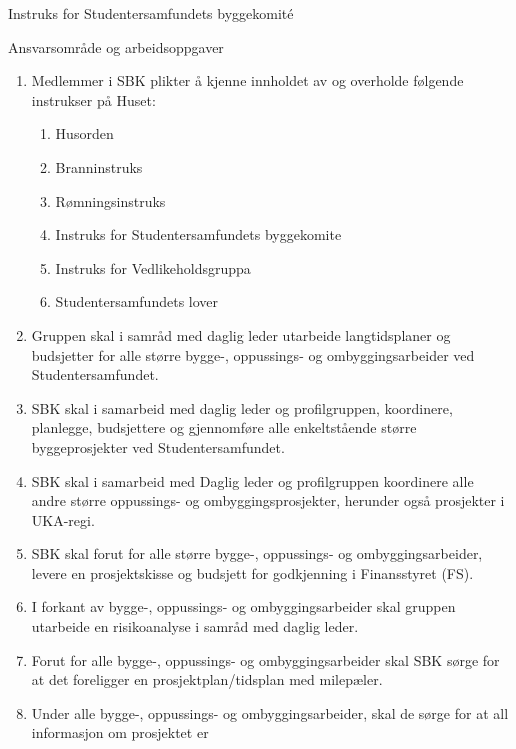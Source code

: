\begin{instruks}{Instruks for Studentersamfundets byggekomité}{}{}
    \begin{instruksledd}{ Ansvarsområde og arbeidsoppgaver}
        \begin{enumerate}
            \item Medlemmer i SBK plikter å kjenne innholdet av og overholde følgende instrukser på
                Huset:
                \begin{enumerate}
                    \item Husorden
                    \item Branninstruks
                    \item Rømningsinstruks
                    \item Instruks for Studentersamfundets byggekomite
                    \item Instruks for Vedlikeholdsgruppa
                    \item Studentersamfundets lover
                \end{enumerate}
            \item Gruppen skal i samråd med daglig leder utarbeide langtidsplaner og
                budsjetter for alle større bygge-,
                oppussings- og ombyggingsarbeider ved Studentersamfundet.
            \item SBK skal i samarbeid med daglig leder og profilgruppen, koordinere,
                planlegge, budsjettere og gjennomføre
                alle enkeltstående større byggeprosjekter ved Studentersamfundet.
            \item SBK skal i samarbeid med Daglig leder og profilgruppen koordinere alle
                andre større oppussings- og
                ombyggingsprosjekter, herunder også prosjekter i UKA-regi.
            \item SBK skal forut for alle større bygge-, oppussings- og
                ombyggingsarbeider, levere en prosjektskisse og
                budsjett for godkjenning i Finansstyret (FS).
            \item I forkant av bygge-, oppussings- og ombyggingsarbeider skal gruppen
                utarbeide en risikoanalyse i samråd
                med daglig leder.
            \item  Forut for alle bygge-, oppussings- og ombyggingsarbeider skal SBK sørge
                for at det foreligger en
                prosjektplan/tidsplan med milepæler.
            \item Under alle bygge-, oppussings- og ombyggingsarbeider, skal de sørge for
                at all informasjon om prosjektet er

\end{enumerate}
\end{instruksledd}
\end{instruks}
